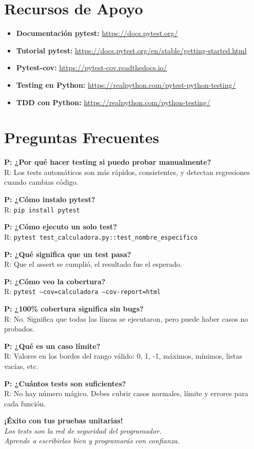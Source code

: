 \documentclass[12pt,a4paper]{article}
\begin{document}
\section{Recursos de Apoyo}

\begin{itemize}[leftmargin=*]
    \item \textbf{Documentación pytest:} \url{https://docs.pytest.org/}
    \item \textbf{Tutorial pytest:} \url{https://docs.pytest.org/en/stable/getting-started.html}
    \item \textbf{Pytest-cov:} \url{https://pytest-cov.readthedocs.io/}
    \item \textbf{Testing en Python:} \url{https://realpython.com/pytest-python-testing/}
    \item \textbf{TDD con Python:} \url{https://realpython.com/python-testing/}
\end{itemize}

\section{Preguntas Frecuentes}

\textbf{P: ¿Por qué hacer testing si puedo probar manualmente?}\\
R: Los tests automáticos son más rápidos, consistentes, y detectan regresiones cuando cambias código.

\textbf{P: ¿Cómo instalo pytest?}\\
R: \texttt{pip install pytest}

\textbf{P: ¿Cómo ejecuto un solo test?}\\
R: \texttt{pytest test\_calculadora.py::test\_nombre\_especifico}

\textbf{P: ¿Qué significa que un test pasa?}\\
R: Que el assert se cumplió, el resultado fue el esperado.

\textbf{P: ¿Cómo veo la cobertura?}\\
R: \texttt{pytest --cov=calculadora --cov-report=html}

\textbf{P: ¿100\% cobertura significa sin bugs?}\\
R: No. Significa que todas las líneas se ejecutaron, pero puede haber casos no probados.

\textbf{P: ¿Qué es un caso límite?}\\
R: Valores en los bordes del rango válido: 0, 1, -1, máximos, mínimos, listas vacías, etc.

\textbf{P: ¿Cuántos tests son suficientes?}\\
R: No hay número mágico. Debes cubrir casos normales, límite y errores para cada función.

\vspace{1cm}

\begin{center}
\textbf{¡Éxito con tus pruebas unitarias!}\\
\textit{Los tests son la red de seguridad del programador.\\
Aprende a escribirlos bien y programarás con confianza.}
\end{center}
\end{document}
